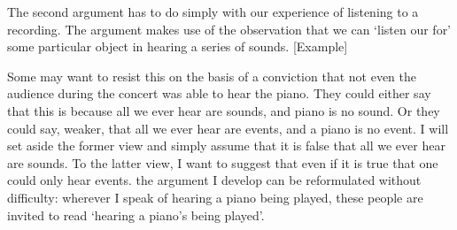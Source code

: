 \documentclass[sloppy, journal, git, bytitle, dodraft]{humapap}
\begin{document}


The second argument has to do simply with our experience of listening to a recording. The argument makes use of the observation that we can `listen our for' some particular object in hearing a series of sounds. [Example]





 
 
Some may want to resist this on the basis of a conviction that not even the audience during the concert was able to hear the piano. They could either say that this is because all we ever hear are sounds, and piano is no sound. Or they could say, weaker, that all we ever hear are events, and a piano is no event. I will set aside the former view and simply assume that it is false that all we ever hear are sounds. To the latter view, I want to suggest that even if it is true that one could only hear events. the argument I develop can be reformulated without difficulty: wherever I speak of hearing a piano being played, these people are invited to read `hearing a piano's being played'.

\end{document}
